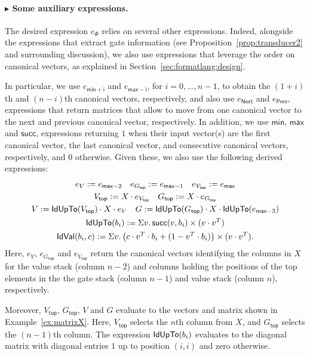 \paragraph{$\blacktriangleright$ Some auxiliary expressions.} 
The desired \langfor expression $e_\Phi$ relies on several other expressions. Indeed, alongside
the expressions that extract gate information (see Proposition~\ref{prop:transducer2} and surrounding discussion), we also use \langfor expressions that leverage the order on canonical vectors, as explained in Section~\ref{sec:formatlang:design}. 

In particular, we use  $e_{\mathsf{min}+\mathsf{i}}$ and  $e_{\mathsf{max}-\mathsf{i}}$, for $i=0,\ldots,n-1$,
to obtain the $(1+i)$th and $(n-i)$th canonical vectors, respectively, and also use $e_{\mathsf{Next}}$ and $e_{\mathsf{Prev}}$, expressions that return matrices that allow to
move from one canonical vector to the next and previous canonical vector, respectively. In addition, we use $\mathsf{min}$, $\mathsf{max}$ and $\mathsf{succ}$,  expressions returning
$1$ when their input vector(s) are the first canonical vector, the last canonical vector, and consecutive canonical vectors, respectively, and $0$ otherwise. Given these, we also use the following derived expressions:
\vspace{-4ex}
\begin{gather*}
   e_{V}:=e_{\mathsf{max}-2} \quad e_{G_{\mathsf{top}}}:=e_{\mathsf{max}-1} \quad     e_{V_{\mathsf{top}}}:=e_{\mathsf{max}} \\ 
  V_{\mathsf{top}}:= X\cdot e_{V_{\mathsf{top}}} \quad  G_{\mathsf{top}} :=X\cdot e_{G_{\mathsf{top}}}\\
     V:= \mathsf{IdUpTo}(V_{\mathsf{top}}) \cdot X \cdot e_V \quad
  G := \mathsf{IdUpTo}(G_{\mathsf{top}})\cdot X \cdot \mathsf{IdUpTo}(e_{\mathsf{max}-3})\\
   \mathsf{IdUpTo}(b_i):=\Sigma v. \, \mathsf{succ}(v,b_i)\times (v\cdot v^T)  \\
\mathsf{IdVal}(b_i, c):=\Sigma v. \, \bigl(c\cdot v^T\cdot b_i + (1- v^T\cdot b_i)\bigr)\times (v\cdot v^T).
 \end{gather*}
Here, $e_V$, $e_{G_{\mathsf{top}}}$ and $e_{V_{\mathsf{top}}}$ return the canonical vectors identifying the columns in $X$ for the value stack (column $n-2$) and columns holding the positions of the top elements in the the gate stack (column $n-1$) and value stack (column $n$), respectively.

 Moreover, 
 $V_{\mathsf{top}}$, $G_{\mathsf{top}}$, $V$ and $G$ evaluate to
the vectors and matrix shown in Example~\ref{ex:matrixX}. Here,  $V_{\mathsf{top}}$
selects the $n$th column from $X$, and  $G_{\mathsf{top}}$ selects the $(n-1)$th column. The expression $\mathsf{IdUpTo}(b_i)$ evaluates to the diagonal matrix with diagonal entries $1$ up to position $(i,i)$ and zero otherwise. 

